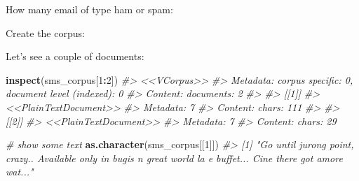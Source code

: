 \documentclass[]{book}
\newenvironment{Shaded}{\begin{snugshade}}{\end{snugshade}}
\newcommand{\CommentTok}[1]{\textcolor[rgb]{0.56,0.35,0.01}{\textit{#1}}}
\newcommand{\DecValTok}[1]{\textcolor[rgb]{0.00,0.00,0.81}{#1}}
\newcommand{\KeywordTok}[1]{\textcolor[rgb]{0.13,0.29,0.53}{\textbf{#1}}}
\newcommand{\NormalTok}[1]{#1}
\newcommand{\OperatorTok}[1]{\textcolor[rgb]{0.81,0.36,0.00}{\textbf{#1}}}
\newcommand{\StringTok}[1]{\textcolor[rgb]{0.31,0.60,0.02}{#1}}
\begin{document}
How many email of type ham or spam:

\begin{Shaded}
\end{Shaded}

Create the corpus:

\begin{Shaded}
\end{Shaded}

Let's see a couple of documents:

\begin{Shaded}
\begin{Highlighting}[]
\KeywordTok{inspect}\NormalTok{(sms_corpus[}\DecValTok{1}\OperatorTok{:}\DecValTok{2}\NormalTok{])}
\CommentTok{#> <<VCorpus>>}
\CommentTok{#> Metadata:  corpus specific: 0, document level (indexed): 0}
\CommentTok{#> Content:  documents: 2}
\CommentTok{#> }
\CommentTok{#> [[1]]}
\CommentTok{#> <<PlainTextDocument>>}
\CommentTok{#> Metadata:  7}
\CommentTok{#> Content:  chars: 111}
\CommentTok{#> }
\CommentTok{#> [[2]]}
\CommentTok{#> <<PlainTextDocument>>}
\CommentTok{#> Metadata:  7}
\CommentTok{#> Content:  chars: 29}
\end{Highlighting}
\end{Shaded}

\begin{Shaded}
\begin{Highlighting}[]
\CommentTok{# show some text}
\KeywordTok{as.character}\NormalTok{(sms_corpus[[}\DecValTok{1}\NormalTok{]])}
\CommentTok{#> [1] "Go until jurong point, crazy.. Available only in bugis n great world la e buffet... Cine there got amore wat..."}
\end{Highlighting}
\end{Shaded}
\end{document}
